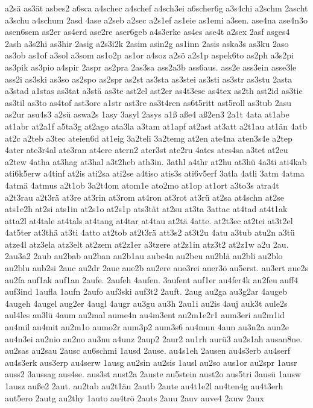 {a2sä
as3ät
asbes2
a6sca
a4schec
a4schef
a4sch3ei
a6scher6g
a3s4chi
a2schm
2ascht
a3schu
a4schum
2asd
4ase
a2seb
a2sec
a2s1ef
as1eie
as1emi
a3sen.
ase4na
ase4n3o
asen6sem
as2er
as4erd
ase2re
aser6geb
a4s3erke
as4es
ase4t
a2sex
2asf
asges4
2ash
a3s2hi
as3hir
2asig
a2s3i2k
2asim
asin2g
as1inn
2asis
aska3s
as3ku
2aso
as3ob
as1of
a3sol
a3som
as1o2p
as1or
a4soz
a2sö
a2s1p
aspek6to
as2ph
a3s2pi
as3pik
as3pio
a4spir
2aspr
as2pra
2as3sa
ass2a3b
ass6aus.
ass2e
ass3ein
asse3le
ass2i
as3ski
as3so
as2spo
as2spr
as2st
as3sta
as3stei
as3sti
as3str
as3stu
2asta
a3stad
a1stas
as3tat
a3stä
as3te
ast2el
ast2er
as4t3ese
as4tex
as2th
ast2id
as3tie
as3til
as3to
as4tof
ast3orc
a1str
ast3re
as3t4ren
as6t5ritt
ast5roll
as3tub
2asu
as2ur
asu4s3
a2sü
aswa2s
1asy
3asyl
2asys
a1ß
aße4
aß2en3
2a1t
4ata
at1abe
at1abr
at2a1f
a5ta3g
at2ago
ata3la
a3tam
at1apf
at2ast
at3att
a2t1au
at1än
4atb
at2c
a2teb
a3tec
ateien6d
at1eig
3a2teli
3a2temg
at2en
ate4na
aten3s4e
a2tep
4ater
ate3r4al
ate3ran
at4ere
atern2
ater3st
ate2ru
4ates
ates4sa
a3tet
at2eu
a2tew
4atha
at3hag
at3hal
a3t2heb
ath3in.
3athl
a4thr
at2hu
at3hü
4a3ti
ati4kab
ati6k5erw
a4tinf
at2is
ati2sa
ati2se
a4tiso
atis3s
ati6v5erf
3atla
4atli
3atm
4atma
4atmä
4atmus
a2t1ob
3a2t4om
atom1e
ato2mo
at1op
at1ort
a3to3s
atra4t
a2t3rau
a2t3rä
at3re
at3rin
at3rom
at4ron
at3rot
at3rü
at2sa
at4schn
at2se
ats1e2h
at2si
ats1in
at2s1o
at2s1p
ats3tät
at2su
at3ta
3attac
at4tad
at4t1ak
atta2l
at4tale
at4tals
at4tang
at4tar
at4tau
at2tä
4atte.
at2t3ec
at2tei
at3t2el
4at5ter
at3thä
at3ti
4atto
at2tob
at2t3rä
att3s2
at3t2u
4atu
a3tub
atu2n
a3tü
atze4l
atz3ela
atz3elt
at2zem
at2z1er
a3tzere
at2z1in
atz3t2
at2z1w
a2u
2au.
2au3a2
2aub
au2bab
au2ban
au2b1au
aube4n
au2beu
au2blä
au2bli
au2blo
au2blu
aub2si
2auc
au2dr
2aue
aue2b
au2ere
aue3rei
auer3ö
au5erst.
au3ert
aue2s
au2fa
auf1ak
auf1an
2aufe.
2aufeh
4aufen.
3aufent
auf1er
au4fer4k
au2feu
auff4
auf3ind
1aufla
1aufn
2aufo
auf3ski
auf3t2
2auft.
2aug
au2ga
au3g2ar
4augeb
4augeh
4augel
aug2er
4augl
4augr
au3gu
au3h
2au1i
au2is
4auj
auk3t
aule2s
aul4les
au3lü
4aum
au2mal
aume4n
au4m3ent
au2m1e2r1
aum3eri
au2m1id
au4mil
au4mit
au2m1o
aumo2r
aum3p2
aum3s6
au4mun
4aun
au3n2a
aun2e
au4n3ei
au2nio
au2no
au3nu
a4unz
2aup2
2aur2
au1rh
aurü3
au2s1ah
ausan8ne.
au2sas
au2sau
2ausc
au6schmi
1ausd
2ause.
au4s1eh
2ausen
au4s3erb
au4serf
au4s3erk
aus3erp
au4serw
1ausg
au2sin
au2sis
1ausl
au2so
aus1or
au2spr
1ausr
auss2
3aussag
aus4se.
aus3st
aust2a
2auste
au5stein
aust2o
aus5tri
3ausü
1ausw
1ausz
auße2
2aut.
au2tab
au2t1äu
2autb
2aute
au4t1e2l
au4ten4g
au4t3erh
aut5ero
2autg
au2thy
1auto
au4trö
2auts
2auu
2auv
auve4
2auw
2aux
}
